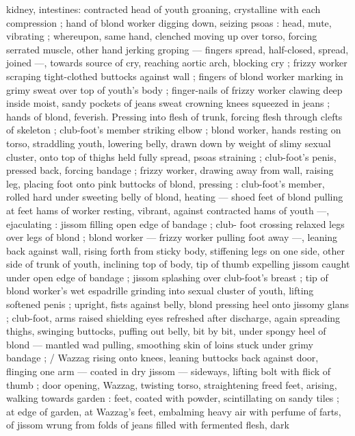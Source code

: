 kidney, intestines: contracted head of youth groaning, crystalline 
with each compression ; hand of blond worker digging down, seizing 
psoas : head, mute, vibrating ; whereupon, same hand, clenched 
moving up over torso, forcing serrated muscle, other hand jerking 
groping --- fingers spread, half-closed, spread, joined ---, towards 
source of cry, reaching aortic arch, blocking cry ; frizzy worker 
scraping tight-clothed buttocks against wall ; fingers of blond worker 
marking in grimy sweat over top of youth's body ; finger-nails of 
frizzy worker clawing deep inside moist, sandy pockets of jeans 
sweat crowning knees squeezed in jeans ; hands of blond, feverish. 
Pressing into flesh of trunk, forcing flesh through clefts of skeleton 
; club-foot's member striking elbow ; blond worker, hands resting on 
torso, straddling youth, lowering belly, drawn down by weight of 
slimy sexual cluster, onto top of thighs held fully spread, psoas 
straining ; club-foot's penis, pressed back, forcing bandage ; frizzy 
worker, drawing away from wall, raising leg, placing foot onto pink 
buttocks of blond, pressing : club-foot's member, rolled hard under 
sweeting belly of blond, heating --- shoed feet of blond pulling at 
feet hams of worker resting, vibrant, against contracted hams of 
youth ---, ejaculating : jissom filling open edge of bandage ; club- 
foot crossing relaxed legs over legs of blond ; blond worker --- frizzy 
worker pulling foot away ---, leaning back against wall, rising forth 
from sticky body, stiffening legs on one side, other side of trunk of 
youth, inclining top of body, tip of thumb expelling jissom caught 
under open edge of bandage ; jissom splashing over club-foot's 
breast ; tip of blond worker's wet espadrille grinding into sexual 
cluster of youth, lifting softened penis ; upright, fists against belly, 
blond pressing heel onto jissomy glans ; club-foot, arms raised 
shielding eyes refreshed after discharge, again spreading thighs, 
swinging buttocks, puffing out belly, bit by bit, under spongy heel of 
blond --- mantled wad pulling, smoothing skin of loins stuck under 
grimy bandage ; {\slash} Wazzag rising onto knees, leaning buttocks back 
against door, flinging one arm --- coated in dry jissom --- sideways, 
lifting bolt with flick of thumb ; door opening, Wazzag, twisting torso, 
straightening freed feet, arising, walking towards garden : feet, 
coated with powder, scintillating on sandy tiles ; at edge of garden, 
at Wazzag's feet, embalming heavy air with perfume of farts, of 
jissom wrung from folds of jeans filled with fermented flesh, dark 
